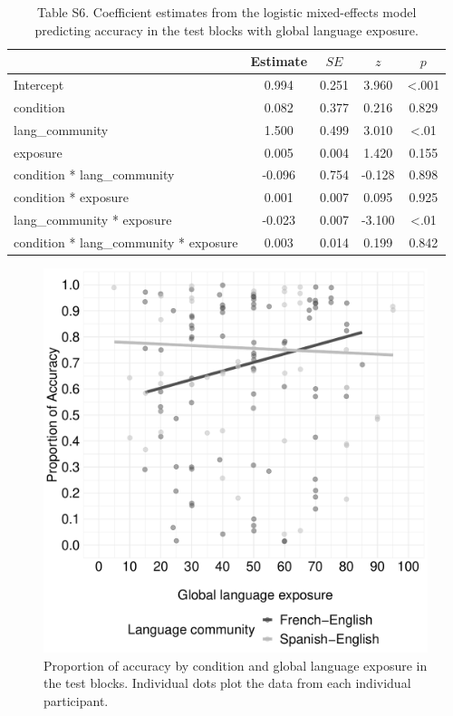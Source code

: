 \documentclass[
  man,floatsintext]{apa7}
\begin{document}
\begin{table}[H]

\begin{center}
\begin{threeparttable}

\caption{\label{tab:unnamed-chunk-18}Table S6. Coefficient estimates from the logistic mixed-effects model predicting accuracy in the test blocks with global language exposure.}

\begin{tabular}{lcccc}
\toprule
 & Estimate & $SE$ & $z$ & $p$\\
\midrule
Intercept & 0.994 & 0.251 & 3.960 & <.001\\
condition & 0.082 & 0.377 & 0.216 & 0.829\\
lang\_community & 1.500 & 0.499 & 3.010 & <.01\\
exposure & 0.005 & 0.004 & 1.420 & 0.155\\
condition * lang\_community & -0.096 & 0.754 & -0.128 & 0.898\\
condition * exposure & 0.001 & 0.007 & 0.095 & 0.925\\
lang\_community * exposure & -0.023 & 0.007 & -3.100 & <.01\\
condition * lang\_community * exposure & 0.003 & 0.014 & 0.199 & 0.842\\
\bottomrule
\end{tabular}

\end{threeparttable}
\end{center}

\end{table}

\begin{figure}

{\centering \includegraphics[width=0.5\linewidth]{TabletSwitch_supplemental_files/figure-latex/FigureS3-1} 

}

\caption{Proportion of accuracy by condition and global language exposure in the test blocks. Individual dots plot the data from each individual participant.}\label{fig:FigureS3}
\end{figure}
\end{document}
